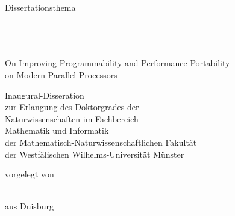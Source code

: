 
\begin{titlepage}

\begin{addmargin}[-1cm]{-3cm}
\begin{center}
\large

\hfill
\vfill

{\LARGE {}}

\vfill

Dissertationsthema

\vfill

\begingroup
  \huge \color{\titleColor}\\ \\  \\
  \bigskip
  \bigskip
  \Large {On Improving Programmability and Performance Portability\\ on Modern Parallel Processors} \bigskip
\endgroup

\vfill

\begin{center}
  \begin{minipage}[t]{.85\textwidth}
    \centering
    Inaugural-Disseration\\ zur Erlangung des Doktorgrades der\\
    Naturwissenschaften im Fachbereich\\ Mathematik und Informatik\\ der
    Mathematisch-Naturwissenschaftlichen Fakultät\\ der Westfälischen
    Wilhelms-Universität Münster
  \end{minipage}
\end{center}

\vfill

vorgelegt von

\bigskip \bigskip

\spacedlowsmallcaps{\myName} \\ \medskip
aus Duisburg

\bigskip \bigskip

\myTime

\vfill

\end{center}
\end{addmargin}

\end{titlepage}
